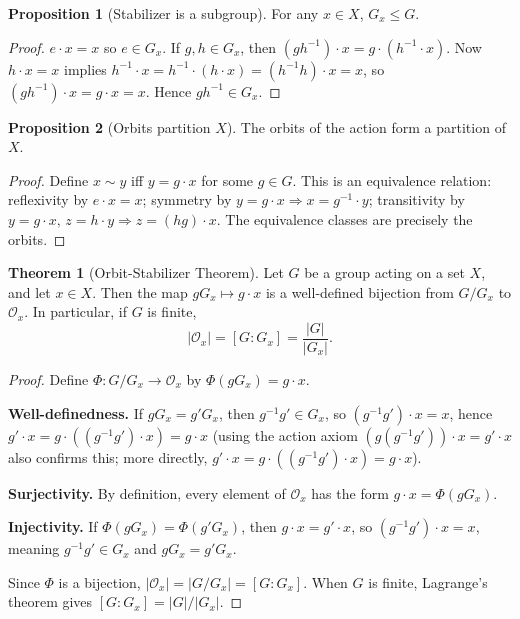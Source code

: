 \documentclass[12pt,a4paper,openany]{book}
\theoremstyle{definition}
\newtheorem{theorem}{Theorem}[chapter]
\newtheorem{proposition}{Proposition}[chapter]
\theoremstyle{remark}
\begin{document}
\begin{proposition}[Stabilizer is a subgroup]\label{prop:stabilizer-subgroup}
For any $x\in X$, $G_x\le G$.
\end{proposition}

\begin{proof}
$e\cdot x=x$ so $e\in G_x$.  If $g,h\in G_x$, then
$(gh^{-1})\cdot x = g\cdot(h^{-1}\cdot x)$.
Now $h\cdot x=x$ implies $h^{-1}\cdot x=h^{-1}\cdot(h\cdot x)
=(h^{-1}h)\cdot x=x$, so $(gh^{-1})\cdot x=g\cdot x=x$.
Hence $gh^{-1}\in G_x$.
\end{proof}

\begin{proposition}[Orbits partition $X$]\label{prop:orbits-partition}
The orbits of the action form a partition of $X$.
\end{proposition}

\begin{proof}
Define $x\sim y$ iff $y=g\cdot x$ for some $g\in G$.  This is an
equivalence relation: reflexivity by $e\cdot x=x$; symmetry by
$y=g\cdot x\Rightarrow x=g^{-1}\cdot y$; transitivity by
$y=g\cdot x,\, z=h\cdot y\Rightarrow z=(hg)\cdot x$.
The equivalence classes are precisely the orbits.
\end{proof}

\begin{theorem}[Orbit-Stabilizer Theorem]\label{thm:orbit-stabilizer}
Let $G$ be a group acting on a set $X$, and let $x\in X$.  Then
the map $gG_x\mapsto g\cdot x$ is a well-defined bijection from
$G/G_x$ to $\mathcal{O}_x$.  In particular, if $G$ is finite,
\[
   |\mathcal{O}_x| = [G:G_x] = \frac{|G|}{|G_x|}.
\]
\end{theorem}

\begin{proof}
Define $\Phi\colon G/G_x\to\mathcal{O}_x$ by $\Phi(gG_x)=g\cdot x$.

\textbf{Well-definedness.}
If $gG_x=g'G_x$, then $g^{-1}g'\in G_x$, so
$(g^{-1}g')\cdot x=x$, hence $g'\cdot x=g\cdot((g^{-1}g')\cdot x)
= g\cdot x$ (using the action axiom $(g(g^{-1}g'))\cdot x = g'\cdot x$
also confirms this; more directly,
$g'\cdot x = g\cdot((g^{-1}g')\cdot x) = g\cdot x$).

\textbf{Surjectivity.}
By definition, every element of $\mathcal{O}_x$ has the form
$g\cdot x=\Phi(gG_x)$.

\textbf{Injectivity.}
If $\Phi(gG_x)=\Phi(g'G_x)$, then $g\cdot x=g'\cdot x$, so
$(g^{-1}g')\cdot x=x$, meaning $g^{-1}g'\in G_x$ and $gG_x=g'G_x$.

Since $\Phi$ is a bijection, $|\mathcal{O}_x|=|G/G_x|=[G:G_x]$.
When $G$ is finite, Lagrange's theorem gives $[G:G_x]=|G|/|G_x|$.
\end{proof}
\end{document}
